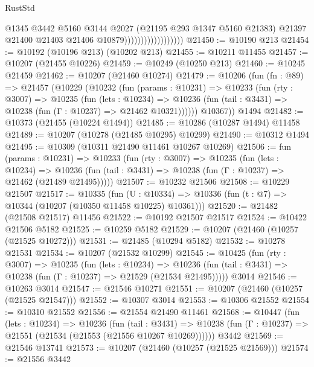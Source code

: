 \begin{lexlean}{RustStd}
\begin{coremodule}
                                        @1345
                                        @3442
                                        @5160
                                        @3144
                                        @2027
                                        (@21195 @293 @1347 @5160 @21383)
                                        @21397
                                        @21400
                                        @21403
                                        @21406
                                        @10879))))))))))))))))))
@21450 := @10190 @213
@21454 := @10192 (@10196 @213) (@10202 @213)
@21455 := @10211 @11455
@21457 := @10207 (@21455 @10226)
@21459 := @10249 (@10250 @213)
@21460 := @10245 @21459
@21462 := @10207 (@21460 @10274)
@21479 := @10206
    (fun (fn : @89) =>
    @21457
      (@10229
        (@10232
          (fun (params : @10231) =>
          @10233
            (fun (rty : @3007) =>
            @10235
              (fun (lets : @10234) =>
              @10236 (fun (tail : @3431) => @10238 (fun (Γ : @10237) => @21462 @10321))))))
        @10367))
    @1494
@21482 := @10373 (@21455 (@10224 @1494))
@21485 := @10286 (@10287 @1494) @11458
@21489 := @10207 (@10278 (@21485 @10295) @10299)
@21490 := @10312 @1494
@21495 := @10309 (@10311 @21490 @11461 @10267 @10269)
@21506 := fun (params : @10231) =>
  @10233
    (fun (rty : @3007) =>
    @10235
      (fun (lets : @10234) =>
      @10236 (fun (tail : @3431) => @10238 (fun (Γ : @10237) => @21462 (@21489 @21495)))))
@21507 := @10232 @21506
@21508 := @10229 @21507
@21517 := @10335
    (fun (U : @10334) => @10336 (fun (t : @7) => @10344 (@10207 (@10350 @11458 @10225) @10361)))
@21520 := @21482 (@21508 @21517) @11456
@21522 := @10192 @21507 @21517
@21524 := @10422 @21506 @5182
@21525 := @10259 @5182
@21529 := @10207 (@21460 (@10257 (@21525 @10272)))
@21531 := @21485 (@10294 @5182)
@21532 := @10278 @21531
@21534 := @10207 (@21532 @10299)
@21545 := @10425
    (fun (rty : @3007) =>
    @10235
      (fun (lets : @10234) =>
      @10236 (fun (tail : @3431) => @10238 (fun (Γ : @10237) => @21529 (@21534 @21495)))))
    @3014
@21546 := @10263 @3014
@21547 := @21546 @10271
@21551 := @10207 (@21460 (@10257 (@21525 @21547)))
@21552 := @10307 @3014
@21553 := @10306 @21552
@21554 := @10310 @21552
@21556 := @21554 @21490 @11461
@21568 := @10447
    (fun (lets : @10234) =>
    @10236
      (fun (tail : @3431) =>
      @10238 (fun (Γ : @10237) => @21551 (@21534 (@21553 (@21556 @10267 @10269))))))
    @3442
@21569 := @21546 @13741
@21573 := @10207 (@21460 (@10257 (@21525 @21569)))
@21574 := @21556 @3442

\end{coremodule}
\end{lexlean}
